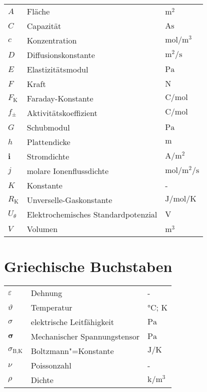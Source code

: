 {\begin{longtable}{@{}p{\TabulatorVZ}@{}p{\TabulatorTX}p{\TabulatorEH}@{}}
	$A$					& Fläche					&$\si{\metre\squared}$\\
	$C$					& Capazität					&$\si{\ampere\s}$\\
	$c$					& Konzentration				&$\si{\mole\per\metre\cubed}$\\
	$D$					& Diffusionskonstante		&$\si{\metre\squared\per\second}$\\
	$E$					& Elastizitätsmodul			&$\si{\pascal}$\\
	$F$					& Kraft						&$\si{\newton}$\\
	$F_{\text{K}}$		& Faraday-Konstante			&$\si{\coulomb\per\mole}$\\
	$f_{\pm}$			& Aktivitätskoeffizient		&$\si{\coulomb\per\mole}$\\
	$G$					& Schubmodul				&$\si{\pascal}$\\
	$h$					& Plattendicke				&$\si{\metre}$\\
	$\textbf{i}$		& Stromdichte				&$\si{\ampere\per\metre\squared}$\\
	$j$					& molare Ionenflussdichte	&$\si{\mole\per\metre\squared\per\second}$\\
	$K$					& Konstante					&-\\
	$R_{\text{K}}$		& Unverselle-Gaskonstante	&$\si{\joule\per\mole\per\kelvin}$\\
	$U_{\theta}$ 		& Elektrochemisches Standardpotenzial	& $\si{\volt}$\\
	$V$					& Volumen					&$\si{\cubic\metre}$
\end{longtable}

\section*{Griechische Buchstaben}
\begin{longtable}{@{}p{\TabulatorVZ}@{}p{\TabulatorTX}p{\TabulatorEH}@{}}
	$\varepsilon$			& Dehnung						& -	\\
	$\vartheta$				& Temperatur					& $\si{\celsius}$; $\si{\kelvin}$ \\
	$\sigma$				& elektrische Leitfähigkeit		& $\si{\pascal}$ \\
	$\boldsymbol{\sigma}$	& Mechanischer Spannungstensor	& $\si{\pascal}$ \\
	$\sigma_{\text{B,K}}$	& Boltzmann"=Konstante 			& $\si{\joule\per\kelvin}$ \\
	$\nu$					& Poissonzahl					& -	\\
	$\rho$					& Dichte						& $\si{\kilo\per\metre\cubed}$
\end{longtable}

}
